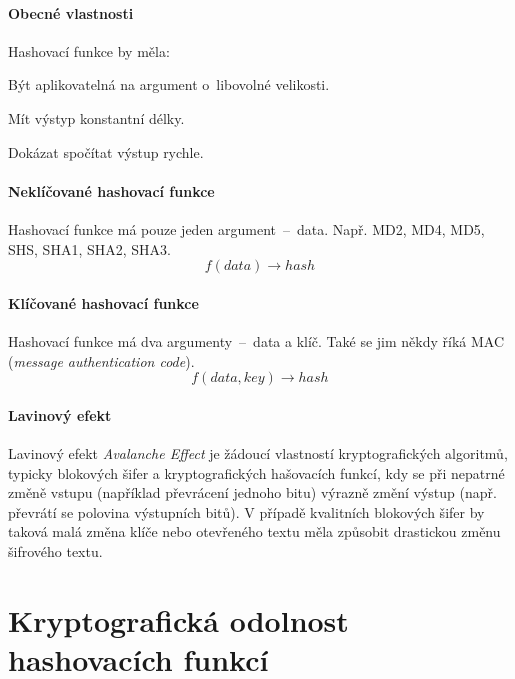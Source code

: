 \paragraph*{Obecné vlastnosti} Hashovací funkce by měla: \begin{compactitem}
    \item Být aplikovatelná na argument o~libovolné velikosti.
    \item Mít výstyp konstantní délky.
    \item Dokázat spočítat výstup rychle.
\end{compactitem}

\paragraph*{Neklíčované hashovací funkce} Hashovací funkce má pouze jeden argument~--~data. Např. MD2, MD4, MD5, SHS, SHA1, SHA2, SHA3. $$f(data) \rightarrow hash$$

\paragraph*{Klíčované hashovací funkce} Hashovací funkce má dva argumenty~--~data a klíč. Také se jim někdy říká MAC (\textit{message authentication code}). $$f(data, key) \rightarrow hash$$

\paragraph*{Lavinový efekt} Lavinový efekt \textit{Avalanche Effect} je žádoucí vlastností kryptografických algoritmů, typicky blokových šifer a kryptografických hašovacích funkcí, kdy se při nepatrné změně vstupu (například převrácení jednoho bitu) výrazně změní výstup (např. převrátí se polovina výstupních bitů). V případě kvalitních blokových šifer by taková malá změna klíče nebo otevřeného textu měla způsobit drastickou změnu šifrového textu.


\section{Kryptografická odolnost hashovacích funkcí}

